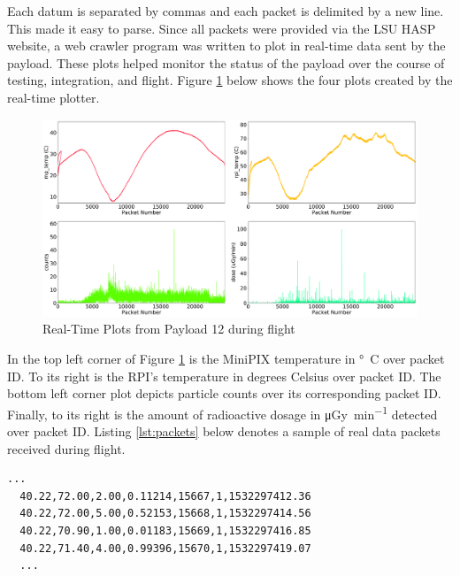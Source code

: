 Each datum is separated by commas and each packet is delimited by a new line. This made it easy to parse. Since all packets were provided 
via the LSU HASP website, a web crawler program was written to plot in real-time data sent by the payload. These plots helped monitor the 
status of the payload over the course of testing, integration, and flight. Figure \ref{fig:rtp} below shows the four plots created by the 
real-time plotter. 

\begin{figure}[H]
	\begin{center}
	\includegraphics[width=\textwidth]{figures/2018EnvironmentalPlots.pdf}
	\caption{Real-Time Plots from Payload 12 during flight}
	\label{fig:rtp}
	\end{center}
\end{figure}

In the top left corner of Figure \ref{fig:rtp} is the MiniPIX temperature in \si{\degree C} over packet ID. 
To its right is the RPI's temperature in degrees Celsius over packet ID. 
The bottom left corner plot depicts particle counts over its corresponding packet ID. 
Finally, to its right is the amount of radioactive dosage in \si{\micro\gray\per\minute} detected over packet ID.
Listing \ref{lst:packets} below denotes a sample of real data packets received during flight. 

\lstset{basicstyle=\small, numbers=left, xleftmargin=2em, frame=tb, label = Downlinks, framexleftmargin=1.5em}
\begin{lstlisting}[caption = Sample of downlinked data packets ID: 15667 - 15670, label={lst:packets}]
  ...
  40.22,72.00,2.00,0.11214,15667,1,1532297412.36
  40.22,72.00,5.00,0.52153,15668,1,1532297414.56
  40.22,70.90,1.00,0.01183,15669,1,1532297416.85
  40.22,71.40,4.00,0.99396,15670,1,1532297419.07
  ...
\end{lstlisting}

